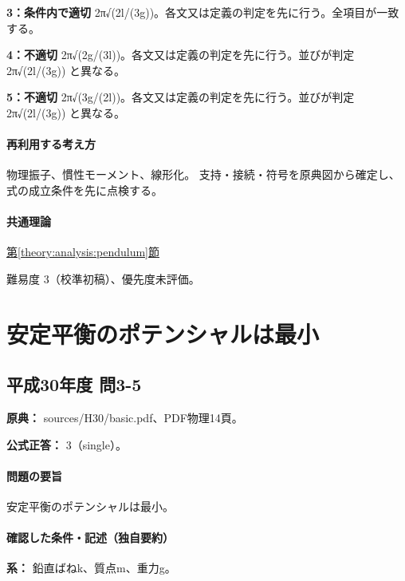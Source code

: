 \noindent\textbf{3：条件内で適切} 2π√(2l/(3g))。各文又は定義の判定を先に行う。全項目が一致する。\par

\noindent\textbf{4：不適切} 2π√(2g/(3l))。各文又は定義の判定を先に行う。並びが判定 2π√(2l/(3g)) と異なる。\par

\noindent\textbf{5：不適切} 2π√(3g/(2l))。各文又は定義の判定を先に行う。並びが判定 2π√(2l/(3g)) と異なる。\par

\paragraph{再利用する考え方} 物理振子、慣性モーメント、線形化。 支持・接続・符号を原典図から確定し、式の成立条件を先に点検する。

\paragraph{共通理論} \hyperref[theory:analysis:pendulum]{第\ref*{theory:analysis:pendulum}節}

\par 難易度 3（校準初稿）、優先度未評価。

\section{安定平衡のポテンシャルは最小}

\subsection{平成30年度 問3-5}
\label{q:h30-reg-basic-3-5}

\noindent\textbf{原典：} sources/H30/basic.pdf、PDF物理14頁。

\textbf{公式正答：} 3（single）。

\paragraph{問題の要旨} 安定平衡のポテンシャルは最小。

\paragraph{確認した条件・記述（独自要約）}\mbox{}\par

\noindent\textbf{系：} 鉛直ばねk、質点m、重力g。\par

